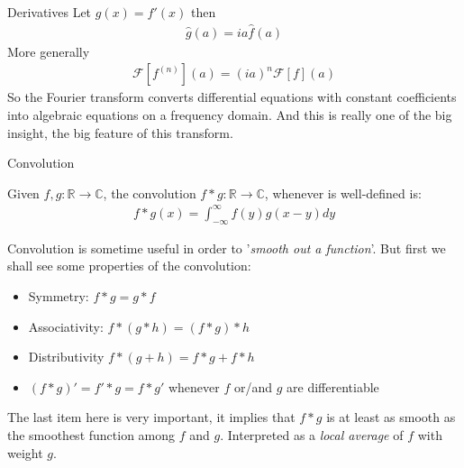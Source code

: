 \begin{parag}{Derivatives}
    Let $g\left(x\right) = f'\left(x\right)$ then 
	\begin{align*} 
		\hat{g}\left(a\right) =  ia \hat{f}\left(a\right)
	\end{align*}
	More generally 
	\begin{align*} 
		\mathcal{F}\left[f^{\left(n\right)}\right]\left(a\right) = \left(ia\right)^{n}\mathcal{F}\left[f\right]\left(a\right)
	\end{align*}
	So the Fourier transform converts differential equations with constant coefficients into algebraic equations on a frequency domain. And this is really one of the big insight, the big feature of this transform.
\end{parag}

\begin{parag}{Convolution}
    \begin{definition}
    Given $f, g : \mathbb{R} \to \mathbb{C}$, the convolution $f \ast g : \mathbb{R} \to \mathbb{C}$, whenever is well-defined is:
	\begin{align*} 
		f \ast g \left(x\right) =  \int_{-\infty}^{\infty} f\left(y\right) g\left(x - y\right)dy
	\end{align*}
    \end{definition}
	Convolution is sometime useful in order to '\textit{smooth out a function}'. But first we shall see some properties of the convolution:
	\begin{itemize}
		\item Symmetry: $f \ast g =  g\ast f$ 
	    \item Associativity: $f \ast \left(g \ast h\right) =  \left(f \ast g\right) \ast h$
	    \item Distributivity $f \ast \left(g + h\right) =  f \ast g + f \ast h$
	    \item $\left(f \ast g\right)' =  f' \ast g = f \ast g'$ whenever $f$ or/and $g$ are differentiable
	\end{itemize}
	The last item here is very important, it implies that $f \ast g$ is at least as smooth as the smoothest function among $f$ and $g$. Interpreted as a \textit{local average} of $f$ with weight $g$.\\
\end{parag}

